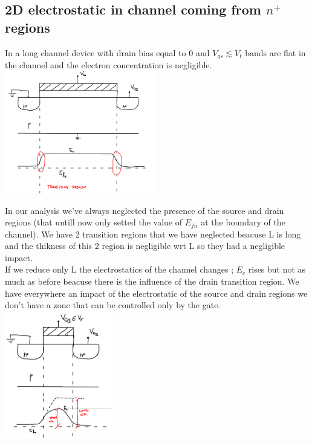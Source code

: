 \subsection{2D electrostatic in channel coming from $n^+$ regions}
In a long channel device with drain bias equal to 0 and $V_{gs} \lesssim V_t$ bands are flat in the channel and the electron concentration is negligible.\\
\centering
\includegraphics[width=0.5\textwidth]{longch.png}\\
\raggedright
In our analysis we've always neglected the presence of the source and drain regions (that untill now only setted the value of $E_{fn}$ at the boundary of the channel). We have 2 transition regions that we have neglected beacuse L is long and the thikness of this 2 region is negligible wrt L so they had a negligible impact.\\
If we reduce only L the electrostatics of the channel changes ; $E_c$ rises but not as much as before beacuse there is the influence of the drain transition region. We have everywhere an impact of the electrostatic of the source and drain regions we don't have a zone that can be controlled only by the gate.\\

\centering
\includegraphics[width=0.35\textwidth]{shortch.png}\\
\raggedright

